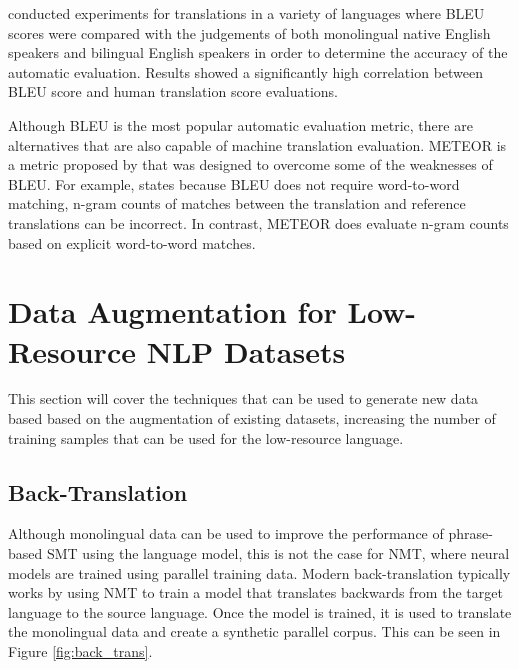 \cite{papineni_bleu_2001} conducted experiments for translations in a variety of languages where \acrshort{BLEU} scores were compared with the judgements of both monolingual native English speakers and bilingual English speakers in order to determine the accuracy of the automatic evaluation. Results showed a significantly high correlation between \acrshort{BLEU} score and human translation score evaluations.

Although \acrshort{BLEU} is the most popular automatic evaluation metric, there are alternatives that are also capable of machine translation evaluation. \acrfull{METEOR} is a metric proposed by \cite{banerjee_meteor_2005} that was designed to overcome some of the weaknesses of \acrshort{BLEU}. For example, \cite{banerjee_meteor_2005} states because \acrshort{BLEU} does not require word-to-word matching, n-gram counts of matches between the translation and reference translations can be incorrect. In contrast, \acrshort{METEOR} does evaluate n-gram counts based on explicit word-to-word matches. 

\section{Data Augmentation for Low-Resource NLP Datasets}
\label{sec:2-low_resource_mt}

This section will cover the techniques that can be used to generate new data based based on the augmentation of existing datasets, increasing the number of training samples that can be used for the low-resource language.

\subsection{Back-Translation}
Although monolingual data can be used to improve the performance of phrase-based \acrfull{SMT} using the language model, this is not the case for \acrshort{NMT}, where neural models are trained using parallel training data. Modern back-translation typically works by using \acrshort{NMT} to train a model that translates backwards from the target language to the source language. Once the model is trained, it is used to translate the monolingual data and create a synthetic parallel corpus. This can be seen in Figure \ref{fig:back_trans}.

